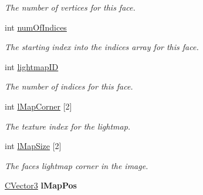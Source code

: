 \begin{DoxyCompactItemize}
\begin{DoxyCompactList}\small\item\em The number of vertices for this face. \end{DoxyCompactList}\item 
int \hyperlink{structt_b_s_p_face_aaf6d0951f9efc27cc287fbbafd8b824a}{num\+Of\+Indices}\hypertarget{structt_b_s_p_face_aaf6d0951f9efc27cc287fbbafd8b824a}{}\label{structt_b_s_p_face_aaf6d0951f9efc27cc287fbbafd8b824a}

\begin{DoxyCompactList}\small\item\em The starting index into the indices array for this face. \end{DoxyCompactList}\item 
int \hyperlink{structt_b_s_p_face_ac445f39cc2660d0953faeaf9324aec58}{lightmap\+ID}\hypertarget{structt_b_s_p_face_ac445f39cc2660d0953faeaf9324aec58}{}\label{structt_b_s_p_face_ac445f39cc2660d0953faeaf9324aec58}

\begin{DoxyCompactList}\small\item\em The number of indices for this face. \end{DoxyCompactList}\item 
int \hyperlink{structt_b_s_p_face_ad8e1654ea10395255cc95b2d0772593a}{l\+Map\+Corner} \mbox{[}2\mbox{]}\hypertarget{structt_b_s_p_face_ad8e1654ea10395255cc95b2d0772593a}{}\label{structt_b_s_p_face_ad8e1654ea10395255cc95b2d0772593a}

\begin{DoxyCompactList}\small\item\em The texture index for the lightmap. \end{DoxyCompactList}\item 
int \hyperlink{structt_b_s_p_face_a9df7252c3d4a9c8205f2b7ef8234b153}{l\+Map\+Size} \mbox{[}2\mbox{]}\hypertarget{structt_b_s_p_face_a9df7252c3d4a9c8205f2b7ef8234b153}{}\label{structt_b_s_p_face_a9df7252c3d4a9c8205f2b7ef8234b153}

\begin{DoxyCompactList}\small\item\em The face\textquotesingle{}s lightmap corner in the image. \end{DoxyCompactList}\item 
\hyperlink{struct_c_vector3}{C\+Vector3} {\bfseries l\+Map\+Pos}\hypertarget{structt_b_s_p_face_ade11d3511317c27b7e0e2d7a061cef39}{}\label{structt_b_s_p_face_ade11d3511317c27b7e0e2d7a061cef39}


\end{DoxyCompactItemize}
